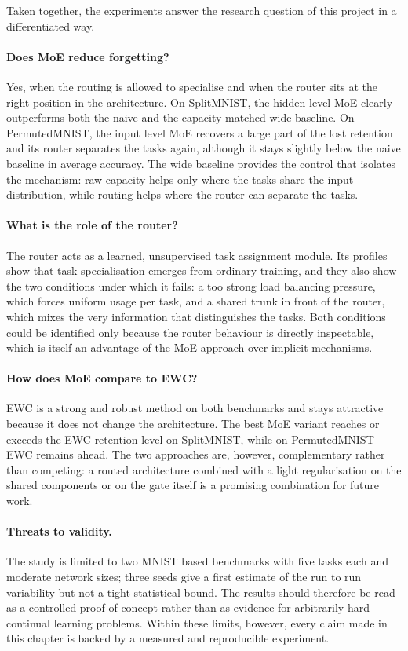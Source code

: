 Taken together, the experiments answer the research question of this
project in a differentiated way.

\paragraph{Does MoE reduce forgetting?} Yes, when the routing is allowed to
specialise and when the router sits at the right position in the
architecture. On SplitMNIST, the hidden level MoE clearly outperforms both
the naive and the capacity matched wide baseline. On PermutedMNIST, the
input level MoE recovers a large part of the lost retention and its
router separates the tasks again, although it stays slightly below the
naive baseline in average accuracy. The wide baseline provides the control that isolates the
mechanism: raw capacity helps only where the tasks share the input
distribution, while routing helps where the router can separate the tasks.

\paragraph{What is the role of the router?} The router acts as a learned,
unsupervised task assignment module. Its profiles show that task
specialisation emerges from ordinary training, and they also show the two
conditions under which it fails: a too strong load balancing pressure,
which forces uniform usage per task, and a shared trunk in front of the
router, which mixes the very information that distinguishes the tasks. Both
conditions could be identified only because the router behaviour is
directly inspectable, which is itself an advantage of the MoE approach over
implicit mechanisms.

\paragraph{How does MoE compare to EWC?} EWC is a strong and robust method
on both benchmarks and stays attractive because it does not change the
architecture. The best MoE variant reaches or exceeds the EWC retention
level on SplitMNIST, while on PermutedMNIST EWC remains ahead. The two
approaches are, however, complementary rather than competing: a routed
architecture combined with a light regularisation on the shared components
or on the gate itself is a promising combination for future work.

\paragraph{Threats to validity.} The study is limited to two MNIST based
benchmarks with five tasks each and moderate network sizes; three seeds
give a first estimate of the run to run variability but not a tight
statistical bound. The results should therefore be read as a controlled
proof of concept rather than as evidence for arbitrarily hard continual
learning problems. Within these limits, however, every claim made in this
chapter is backed by a measured and reproducible experiment.
